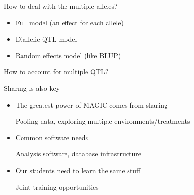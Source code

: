 \documentclass[12pt]{article}
\newcommand{\headsize}{\fontsize{35}{35} \selectfont}
\newcommand{\smallsize}{\fontsize{25}{30} \selectfont}
\newcommand{\smallersize}{\fontsize{20}{25} \selectfont}
\begin{document}
{\hfill \begin{minipage}{9.5in}
How to deal with the multiple alleles?
\end{minipage}

\vspace{10mm}

\hfill \begin{minipage}{9in}
\color{myblue} \smallersize
\begin{itemize}
\itemsep24pt
\item Full model (an effect for each allele)
\item Diallelic QTL model
\item Random effects model (like BLUP)

\end{itemize}
\end{minipage}

\vspace{20mm}

\color{mywhite}
\smallsize

\hfill \begin{minipage}{9.5in}
How to account for multiple QTL?
\end{minipage}



\newpage


\headsize \color{myyellow}
\hfill \begin{minipage}{5.75in}
\centering
Sharing is also key
\end{minipage}

\vspace{25mm}

\color{mywhite}
\smallsize

 \hfill \begin{minipage}{10in}
 \begin{itemize}
 \itemsep24pt
 \item The greatest power of MAGIC comes from sharing

   {\smallersize \color{myblue} Pooling data, exploring multiple environments/treatments}

 \item Common software needs

   {\smallersize \color{myblue} Analysis software, database infrastructure}

 \item Our students need to learn the same stuff

   {\smallersize \color{myblue} Joint training opportunities}


\end{itemize}
\end{minipage}}
\end{document}
